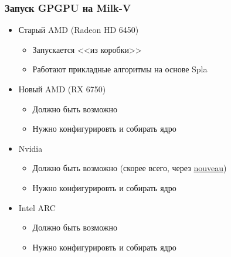\documentclass[xcolor=table,aspectratio=169]{beamer}
\begin{document}
\begin{frame}[fragile]
  \frametitle{Запуск GPGPU на Milk-V}
  \begin{itemize}
    \item[\faCheck] Старый AMD (Radeon HD 6450)
    \begin{itemize}
      \item Запускается <<из коробки>>
      \item Работают прикладные алгоритмы на основе Spla
    \end{itemize} 
    \item[\faGears] Новый AMD (RX 6750)
    \begin{itemize} 
      \item Должно быть возможно
      \item Нужно конфигурировть и собирать ядро
    \end{itemize}
    \item[\faGears] Nvidia
    \begin{itemize} 
      \item Должно быть возможно (скорее всего, через \href{https://nouveau.freedesktop.org/}{nouveau})
      \item Нужно конфигурировть и собирать ядро
    \end{itemize}
    \item[\faGears] Intel ARC
    \begin{itemize} 
      \item Должно быть возможно
      \item Нужно конфигурировть и собирать ядро
    \end{itemize}
  \end{itemize}
\end{frame}
\end{document}
